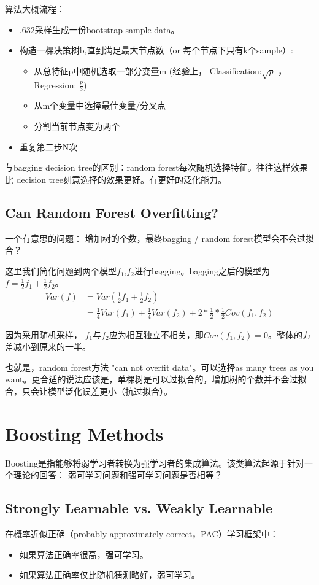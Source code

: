 \documentclass[12pt,a4paper,oneside]{article}
\begin{document}
\begin{CJK*}{UTF8}{gbsn}
算法大概流程：
\begin{itemize}
\item .632采样生成一份bootstrap sample data。
\item 构造一棵决策树b,直到满足最大节点数（or 每个节点下只有k个sample）:
\begin{itemize}
\item 从总特征p中随机选取一部分变量m (经验上， Classification:$\sqrt{p}$ ， Regression: $\frac{p}{3}$)
\item 从m个变量中选择最佳变量/分叉点
\item 分割当前节点变为两个
\end{itemize}
\item 重复第二步N次
\end{itemize}

与bagging decision tree的区别：random forest每次随机选择特征。往往这样效果比 decision tree刻意选择的效果更好。有更好的泛化能力。

\subsection{Can Random Forest Overfitting? }
一个有意思的问题： 增加树的个数，最终bagging / random forest模型会不会过拟合？

这里我们简化问题到两个模型$f_{1}$,$f_{2}$进行bagging。bagging之后的模型为
$f=\frac{1}{2}f_{1}+\frac{1}{2}f_{2}$。
\begin{align*}
Var(f)&= Var(\frac{1}{2}f_{1}+\frac{1}{2}f_{2}) \\
&= \frac{1}{4}Var(f_{1})+\frac{1}{4}Var(f_{2})+2*\frac{1}{2}*\frac{1}{2}Cov(f_{1},f_{2})
\end{align*}

因为采用随机采样， $f_{1}$与$f_{2}$应为相互独立不相关，即$Cov(f_{1},f_{2})=0$。整体的方差减小到原来的一半。

也就是，random forest方法 "can not overfit data"。可以选择as many trees as you want。更合适的说法应该是，单棵树是可以过拟合的，增加树的个数并不会过拟合，只会让模型泛化误差更小（抗过拟合）。

\section{Boosting Methods}
Boosting是指能够将弱学习者转换为强学习者的集成算法。该类算法起源于针对一个理论的回答： 弱可学习问题和强可学习问题是否相等？

\subsection{Strongly Learnable vs. Weakly Learnable}
在概率近似正确（probably approximately correct，PAC）学习框架中：
\begin{itemize}
\item 如果算法正确率很高，强可学习。
\item 如果算法正确率仅比随机猜测略好，弱可学习。
\end{itemize}


\end{CJK*}
\end{document}
